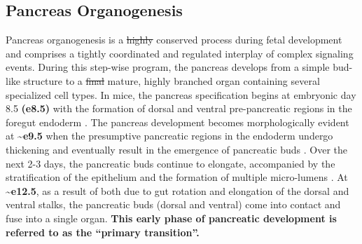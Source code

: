 \subsection{Pancreas Organogenesis} %
\label{sec:pancorgano}

Pancreas organogenesis is a \st{highly} conserved process during fetal development and comprises a tightly coordinated and regulated interplay of complex signaling events. During this step-wise program, the pancreas develops from a simple bud-like structure to a \st{final} mature, highly branched organ containing several specialized cell types. In mice, the pancreas specification begins at embryonic day 8.5 \textbf{(e8.5)} with the formation of dorsal and ventral pre-pancreatic regions in the foregut endoderm \textbf{\cite{shih_pancreas_2013, slack_developmental_1995}}. The pancreas development becomes morphologically evident at  \textbf{\textasciitilde e9.5} when the presumptive pancreatic regions in the endoderm undergo thickening and eventually result in the emergence of pancreatic buds \textbf{\cite{shih_pancreas_2013}}. Over the next 2-3 days, the pancreatic buds continue to elongate, accompanied by the stratification of the epithelium and the formation of multiple micro-lumens \textbf{\cite{pan_pancreas_2011}}. At \textbf{\textasciitilde e12.5}, as a result of both due to gut rotation and elongation of the dorsal and ventral stalks, the pancreatic buds (dorsal and ventral) come into contact and fuse into a single organ. \textbf{This early phase of pancreatic development is referred to as the “primary transition”.}
\\\\

